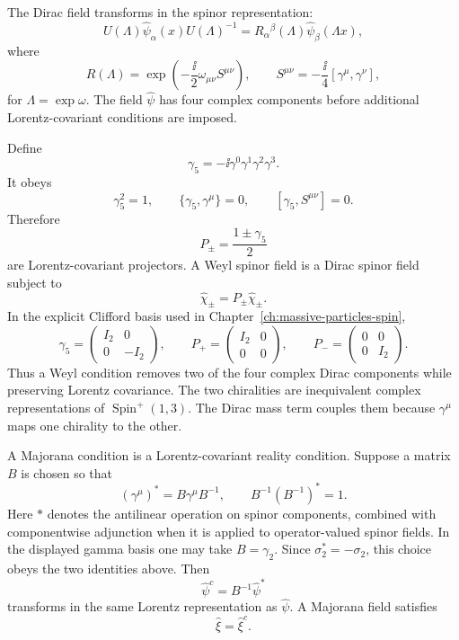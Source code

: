 \begin{definition}
\label{def:dirac-weyl-majorana-local-spinor-data}
The Dirac field transforms in the spinor representation:
\[
  U(\Lambda)\widehat\psi_\alpha(x)U(\Lambda)^{-1}
  =
  R_\alpha{}^\beta(\Lambda)\widehat\psi_\beta(\Lambda x),
\]
where
\[
  R(\Lambda)
  =
  \exp\!\left(-\frac{\ii}{2}\omega_{\mu\nu}S^{\mu\nu}\right),
  \qquad
  S^{\mu\nu}=-\frac{\ii}{4}[\gamma^\mu,\gamma^\nu],
\]
for \(\Lambda=\exp\omega\). The field \(\widehat\psi\) has four complex
components before additional Lorentz-covariant conditions are imposed.

Define
\[
  \gamma_5=-\ii\gamma^0\gamma^1\gamma^2\gamma^3 .
\]
It obeys
\[
  \gamma_5^2=1,
  \qquad
  \{\gamma_5,\gamma^\mu\}=0,
  \qquad
  [\gamma_5,S^{\mu\nu}]=0.
\]
Therefore
\[
  P_\pm=\frac{1\pm\gamma_5}{2}
\]
are Lorentz-covariant projectors. A Weyl spinor field is a Dirac spinor field
subject to
\[
  \widehat\chi_\pm=P_\pm\widehat\chi_\pm .
\]
In the explicit Clifford basis used in Chapter~\ref{ch:massive-particles-spin},
\[
  \gamma_5
  =
  \begin{pmatrix}
    I_2&0\\0&-I_2
  \end{pmatrix},
  \qquad
  P_+
  =
  \begin{pmatrix}
    I_2&0\\0&0
  \end{pmatrix},
  \qquad
  P_-
  =
  \begin{pmatrix}
    0&0\\0&I_2
  \end{pmatrix}.
\]
Thus a Weyl condition removes two of the four complex Dirac components while
preserving Lorentz covariance.
The two chiralities are inequivalent complex representations of
\(\operatorname{Spin}^+(1,3)\). The Dirac mass term couples them because
\(\gamma^\mu\) maps one chirality to the other.

A Majorana condition is a Lorentz-covariant reality condition. Suppose a
matrix \(B\) is chosen so that
\[
  (\gamma^\mu)^*=B\gamma^\mu B^{-1},
  \qquad
  B^{-1}(B^{-1})^*=1.
\]
Here \( * \) denotes the antilinear operation on spinor components, combined
with componentwise adjunction when it is applied to operator-valued spinor
fields. In the displayed gamma basis one may take \(B=\gamma_2\). Since
\(\sigma_2^*=-\sigma_2\), this choice obeys the two identities above. Then
\[
  \widehat\psi^c=B^{-1}\widehat\psi^*
\]
transforms in the same Lorentz representation as \(\widehat\psi\). A Majorana
field satisfies
\[
  \widehat\xi=\widehat\xi^c .
\]
\end{definition}

